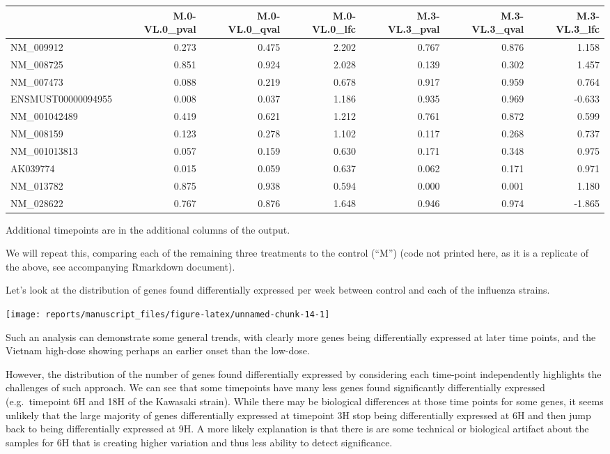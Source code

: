 \documentclass[9pt,a4paper,]{extarticle}
\begin{document}
\begin{tabular}{lrrrrrr}
\toprule
  & M.0-VL.0\_pval & M.0-VL.0\_qval & M.0-VL.0\_lfc & M.3-VL.3\_pval & M.3-VL.3\_qval & M.3-VL.3\_lfc\\
\midrule
NM\_009912 & 0.273 & 0.475 & 2.202 & 0.767 & 0.876 & 1.158\\
NM\_008725 & 0.851 & 0.924 & 2.028 & 0.139 & 0.302 & 1.457\\
NM\_007473 & 0.088 & 0.219 & 0.678 & 0.917 & 0.959 & 0.764\\
ENSMUST00000094955 & 0.008 & 0.037 & 1.186 & 0.935 & 0.969 & -0.633\\
NM\_001042489 & 0.419 & 0.621 & 1.212 & 0.761 & 0.872 & 0.599\\
\addlinespace
NM\_008159 & 0.123 & 0.278 & 1.102 & 0.117 & 0.268 & 0.737\\
NM\_001013813 & 0.057 & 0.159 & 0.630 & 0.171 & 0.348 & 0.975\\
AK039774 & 0.015 & 0.059 & 0.637 & 0.062 & 0.171 & 0.971\\
NM\_013782 & 0.875 & 0.938 & 0.594 & 0.000 & 0.001 & 1.180\\
NM\_028622 & 0.767 & 0.876 & 1.648 & 0.946 & 0.974 & -1.865\\
\bottomrule
\end{tabular}

Additional timepoints are in the additional columns of the output.

We will repeat this, comparing each of the remaining three treatments to the
control (``M'') (code not printed here, as it is a replicate of the above, see
accompanying Rmarkdown document).

Let's look at the distribution of genes found differentially expressed per
week between control and each of the influenza strains.

\begin{center}\texttt{[image: reports/manuscript\_files/figure-latex/unnamed-chunk-14-1]} \end{center}

Such an analysis can demonstrate some general trends, with clearly more genes
being differentially expressed at later time points, and the Vietnam high-dose
showing perhaps an earlier onset than the low-dose.

However, the distribution of the number of genes found differentially
expressed by considering each time-point independently highlights the
challenges of such approach. We can see that some timepoints have many less
genes found significantly differentially expressed (e.g.~timepoint 6H and 18H
of the Kawasaki strain). While there may be biological differences at those
time points for some genes, it seems unlikely that the large majority of genes
differentially expressed at timepoint 3H stop being differentially expressed
at 6H and then jump back to being differentially expressed at 9H. A more
likely explanation is that there is are some technical or biological artifact
about the samples for 6H that is creating higher variation and thus less
ability to detect significance.
\end{document}
